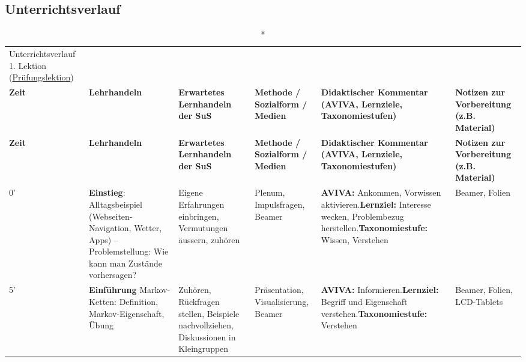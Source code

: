 \begin{landscape}
    \pagestyle{empty}
    \section*{Unterrichtsverlauf}


        \begin{longtable}{@{}l|p{5cm}|p{5cm}|p{4cm}|p{5cm}|p{5cm}@{}}
            \caption*{Unterrichtsverlauf 1. Lektion (\underline{Prüfungslektion})}\\
            \textbf{Zeit} & \textbf{Lehrhandeln} & \textbf{Erwartetes Lernhandeln der SuS} & \textbf{Methode / Sozialform / Medien} & \textbf{Didaktischer Kommentar (AVIVA, Lernziele, Taxonomiestufen)} & \textbf{Notizen zur Vorbereitung (z.B. Material)} \\\midrule\midrule
            \endfirsthead
            \textbf{Zeit} & \textbf{Lehrhandeln} & \textbf{Erwartetes Lernhandeln der SuS} & \textbf{Methode / Sozialform / Medien} & \textbf{Didaktischer Kommentar (AVIVA, Lernziele, Taxonomiestufen)} & \textbf{Notizen zur Vorbereitung (z.B. Material)} \\\midrule\midrule
            \endhead
            0'  & \textbf{Einstieg}: Alltagsbeispiel (Webseiten-Navigation, Wetter, Apps) -- Problemstellung: Wie kann man Zustände vorhersagen? & Eigene Erfahrungen einbringen, Vermutungen äussern, zuhören & Plenum, Impulsfragen, Beamer & \textbf{AVIVA:} Ankommen, Vorwissen aktivieren.\newline\textbf{Lernziel:} Interesse wecken, Problembezug herstellen.\newline\textbf{Taxonomiestufe:} Wissen, Verstehen & Beamer, Folien \\\midrule
            
            5'  & \textbf{Einführung} Markov-Ketten: Definition, Markov-Eigenschaft, Übung & Zuhören, Rückfragen stellen, Beispiele nachvollziehen, Diskussionen in Kleingruppen & Präsentation, Visualisierung, Beamer & \textbf{AVIVA:} Informieren.\newline\textbf{Lernziel:} Begriff und Eigenschaft verstehen.\newline\textbf{Taxonomiestufe:} Verstehen & Beamer, Folien, LCD-Tablets \\\midrule


\end{longtable}
\end{landscape}
